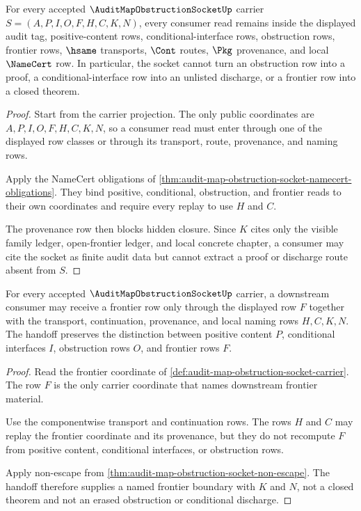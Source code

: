 \begin{theorem}
\label{thm:audit-map-obstruction-socket-non-escape}
For every accepted $\AuditMapObstructionSocketUp$ carrier $S=(A,P,I,O,F,H,C,K,N)$, every consumer read remains inside the displayed audit tag, positive-content rows, conditional-interface rows, obstruction rows, frontier rows, $\hsame$ transports, $\Cont$ routes, $\Pkg$ provenance, and local $\NameCert$ row. In particular, the socket cannot turn an obstruction row into a proof, a conditional-interface row into an unlisted discharge, or a frontier row into a closed theorem.
\end{theorem}
\begin{proof}
Start from the carrier projection. The only public coordinates are $A,P,I,O,F,H,C,K,N$, so a consumer read must enter through one of the displayed row classes or through its transport, route, provenance, and naming rows.

Apply the NameCert obligations of \autoref{thm:audit-map-obstruction-socket-namecert-obligations}. They bind positive, conditional, obstruction, and frontier reads to their own coordinates and require every replay to use $H$ and $C$.

The provenance row then blocks hidden closure. Since $K$ cites only the visible family ledger, open-frontier ledger, and local concrete chapter, a consumer may cite the socket as finite audit data but cannot extract a proof or discharge route absent from $S$.
\end{proof}

\begin{theorem}
\label{thm:audit-map-obstruction-socket-frontier-handoff}
For every accepted $\AuditMapObstructionSocketUp$ carrier, a downstream consumer may receive a frontier row only through the displayed row $F$ together with the transport, continuation, provenance, and local naming rows $H,C,K,N$. The handoff preserves the distinction between positive content $P$, conditional interfaces $I$, obstruction rows $O$, and frontier rows $F$.
\end{theorem}
\begin{proof}
Read the frontier coordinate of \autoref{def:audit-map-obstruction-socket-carrier}. The row $F$ is the only carrier coordinate that names downstream frontier material.

Use the componentwise transport and continuation rows. The rows $H$ and $C$ may replay the frontier coordinate and its provenance, but they do not recompute $F$ from positive content, conditional interfaces, or obstruction rows.

Apply non-escape from \autoref{thm:audit-map-obstruction-socket-non-escape}. The handoff therefore supplies a named frontier boundary with $K$ and $N$, not a closed theorem and not an erased obstruction or conditional discharge.
\end{proof}

